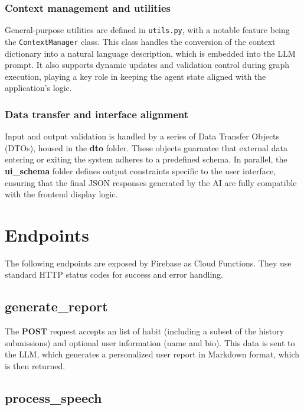 \documentclass{article}
\begin{document}
\subsubsection{Context management and utilities}

General-purpose utilities are defined in \texttt{utils.py}, with a notable feature being the \verb|ContextManager| class.
This class handles the conversion of the context dictionary into a natural language description, which is embedded into the LLM prompt.
It also supports dynamic updates and validation control during graph execution, playing a key role in keeping the agent state aligned with the application's logic.

\subsubsection{Data transfer and interface alignment}

Input and output validation is handled by a series of Data Transfer Objects (DTOs), housed in the \textbf{dto} folder.
These objects guarantee that external data entering or exiting the system adheres to a predefined schema.
In parallel, the \textbf{ui\_schema} folder defines output constraints specific to the user interface, ensuring that the final JSON responses generated by the AI are fully compatible with the frontend display logic.

\section{Endpoints}

The following endpoints are exposed by Firebase as Cloud Functions.
They use standard HTTP status codes for success and error handling.

\subsection{generate\_report}

The \textbf{POST} request accepts an list of habit (including a subset of the history submissions) and optional user information (name and bio).
This data is sent to the LLM, which generates a personalized user report in Markdown format, which is then returned.

\subsection{process\_speech}
\end{document}
